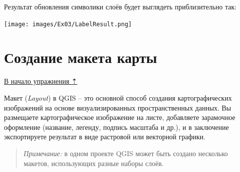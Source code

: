 \documentclass[
  12pt,
]{book}
\begin{document}
Результат обновления символики слоёв будет выглядеть приблизительно так:

\texttt{[image: images/Ex03/LabelResult.png]}

\hypertarget{map-design-population-layout}{%
\section{Создание макета карты}\label{map-design-population-layout}}

\protect\hyperlink{map-design-population}{В начало упражнения ⇡}

Макет (\emph{Layout}) в QGIS -- это основной способ создания картографических изображений на основе визуализированных пространственных данных. Вы размещаете картографическое изображение на листе, добавляете зарамочное оформление (название, легенду, подпись масштаба и др.), и в заключение экспортируете результат в виде растровой или векторной графики.

\begin{quote}
\emph{Примечание:} в одном проекте QGIS может быть создано несколько макетов, использующих разные наборы слоёв.
\end{quote}
\end{document}
